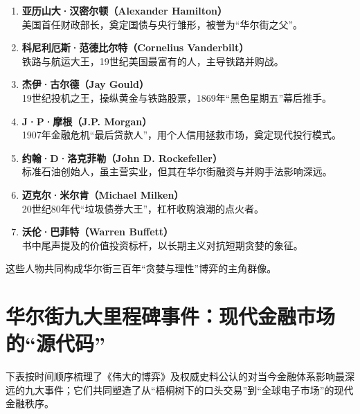 \begin{enumerate}[label=\arabic*.]
  \item \textbf{亚历山大·汉密尔顿（Alexander Hamilton）}  \\
  美国首任财政部长，奠定国债与央行雏形，被誉为“华尔街之父”。

  \item \textbf{科尼利厄斯·范德比尔特（Cornelius Vanderbilt）}  \\
  铁路与航运大王，19世纪美国最富有的人，主导铁路并购战。

  \item \textbf{杰伊·古尔德（Jay Gould）}  \\
  19世纪投机之王，操纵黄金与铁路股票，1869年“黑色星期五”幕后推手。

  \item \textbf{J·P·摩根（J.P. Morgan）}  \\
  1907年金融危机“最后贷款人”，用个人信用拯救市场，奠定现代投行模式。

  \item \textbf{约翰·D·洛克菲勒（John D. Rockefeller）}  \\
  标准石油创始人，虽主营实业，但其在华尔街融资与并购手法影响深远。

  \item \textbf{迈克尔·米尔肯（Michael Milken）}  \\
  20世纪80年代“垃圾债券大王”，杠杆收购浪潮的点火者。

  \item \textbf{沃伦·巴菲特（Warren Buffett）}  \\
  书中尾声提及的价值投资标杆，以长期主义对抗短期贪婪的象征。
\end{enumerate}

\smallskip
这些人物共同构成华尔街三百年“贪婪与理性”博弈的主角群像。


\section{华尔街九大里程碑事件：现代金融市场的“源代码”}

下表按时间顺序梳理了《伟大的博弈》及权威史料公认的对当今金融体系影响最深远的九大事件；它们共同塑造了从“梧桐树下的口头交易”到“全球电子市场”的现代金融秩序。

